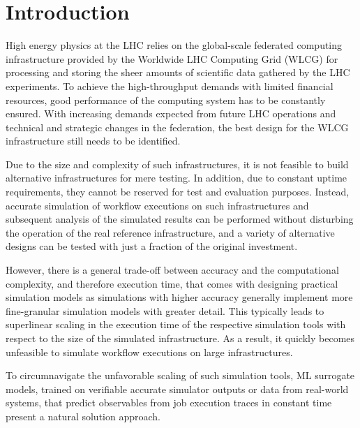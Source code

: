 \section{Introduction}
\label{sec:intro}High energy physics at the LHC relies on the global-scale federated computing infrastructure provided by the Worldwide LHC Computing Grid (WLCG) for processing and storing the sheer amounts of scientific data gathered by the LHC experiments.
To achieve the high-throughput demands with limited financial resources, good performance of the computing system has to be constantly ensured.
With increasing demands expected from future LHC operations and technical and strategic changes in the federation, the best design for the WLCG infrastructure still needs to be identified.

Due to the size and complexity of such infrastructures, it is not feasible to build alternative infrastructures for mere testing.
In addition, due to constant uptime requirements, they cannot be reserved for test and evaluation purposes.
Instead, accurate simulation of workflow executions on such infrastructures and subsequent analysis of the simulated results can be performed without disturbing the operation of the real reference infrastructure, and a variety of alternative designs can be tested with just a fraction of the original investment.

However, there is a general trade-off between accuracy and the computational complexity, and therefore execution time, that comes with designing practical simulation models as simulations with higher accuracy generally implement more fine-granular simulation models with greater detail.
This typically leads to superlinear scaling in the execution time of the respective simulation tools with respect to the size of the simulated infrastructure.
As a result, it quickly becomes unfeasible to simulate workflow executions on large infrastructures.

To circumnavigate the unfavorable scaling of such simulation tools, ML surrogate models, trained on verifiable accurate simulator outputs or data from real-world systems, that predict observables from job execution traces in constant time present a natural solution approach.
